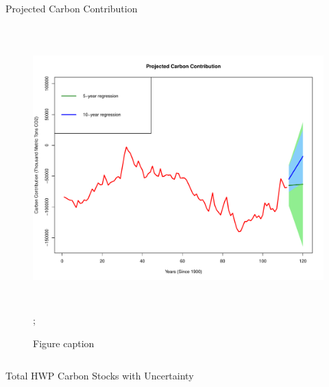 \documentclass[final]{beamer}\usepackage[]{graphicx}\usepackage[]{color}
\newlength{\onecolwid}
\newlength{\twocolwid}
\begin{document}
\begin{frame}[t]
\begin{columns}[t]
\begin{column}{\twocolwid}
\begin{columns}[t,totalwidth=\twocolwid]
\begin{column}{\onecolwid}
\begin{block}{Projected Carbon Contribution}
\begin{figure}
    {\includegraphics[width=1\linewidth,height=11cm]{projection.png}};
    \caption{Figure caption}
\end{figure}
\end{block}


\end{column} %

\end{columns} %


\begin{alertblock}{Total HWP Carbon Stocks with Uncertainty}
\begin{center}


\end{center}
\end{alertblock}
\end{column}
\end{columns}
\end{frame}
\end{document}
